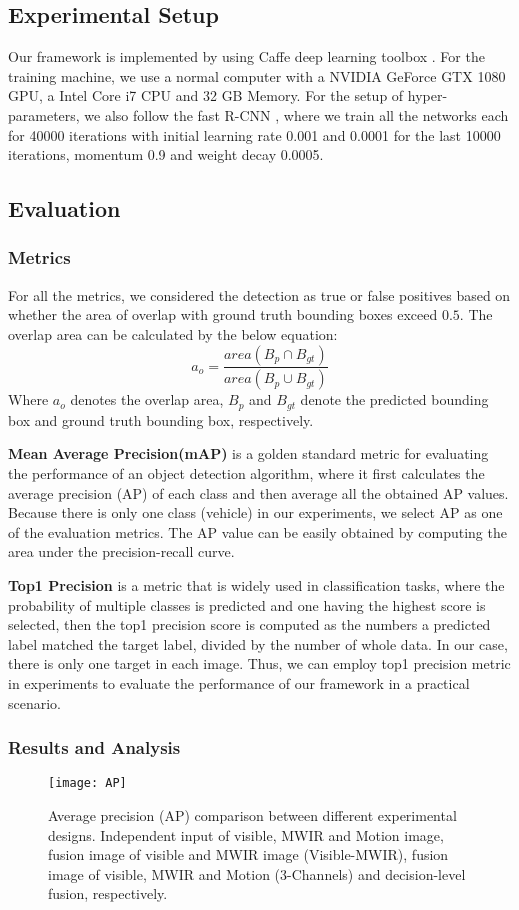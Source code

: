 \documentclass[journal]{IEEEtran}
\begin{document}
\subsection{Experimental Setup}
Our framework is implemented by using Caffe deep learning toolbox \cite{JiaCaffe:}. For the training machine, we use a normal computer with a NVIDIA GeForce GTX 1080 GPU, a Intel Core i7 CPU and 32 GB Memory.
For the setup of hyper-parameters, we also follow the fast R-CNN  \cite{Girshick2016}, where we train all the networks each for 40000 iterations with initial learning rate 0.001 and 0.0001 for the last 10000 iterations, momentum 0.9 and weight decay 0.0005.
\subsection{Evaluation}
\subsubsection{Metrics}
For all the metrics, we considered the detection as true or false positives based on whether the area of overlap with ground truth bounding boxes exceed $0.5$. The overlap area can be calculated by the below equation:
\begin{equation}
a_o = \frac{area(B_p \cap B_{gt})}{area(B_p \cup B_{gt})}
\end{equation}
Where $a_o$ denotes the overlap area, $B_p$ and $B_{gt}$ denote the predicted bounding box and ground truth bounding box, respectively.

\textbf{Mean Average Precision(mAP)} is a golden standard metric for evaluating the performance of an object detection algorithm, where it first calculates the average precision (AP) of each class and then average all the obtained AP values. Because there is only one class (vehicle) in our experiments, we select AP as one of the evaluation metrics. The AP value can be easily obtained by computing the area under the precision-recall curve.

\textbf{Top1 Precision} is a metric that is widely used in classification tasks, where the probability of multiple classes is predicted and one having the highest score is selected, then the top1 precision score is computed as the numbers a predicted label matched the target label, divided by the number of whole data. In our case, there is only one target in each image. Thus, we can employ top1 precision metric in experiments to evaluate the performance of our framework in a practical scenario.
\subsubsection{Results and Analysis}
\begin{figure}[thp]	
\centering
\texttt{[image: AP]}
\caption{Average precision (AP) comparison between different experimental designs. Independent input of visible, MWIR and Motion image, fusion image of visible and MWIR image (Visible-MWIR), fusion image of visible, MWIR and Motion (3-Channels) and decision-level fusion, respectively.}
\label{ap}
\end{figure}
\end{document}
